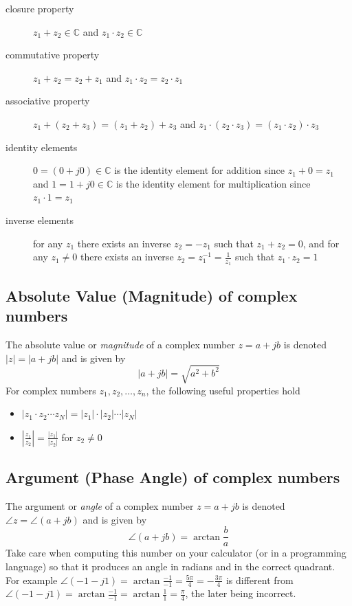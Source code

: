 \begin{description}
\item[closure property] $z_1 + z_2 \in \mathbb{C}$ and  $z_1 \cdot z_2 \in \mathbb{C}$ 
\item[commutative property] $z_1 + z_2 = z_2 + z_1$ and $z_1 \cdot z_2 = z_2 \cdot z_1$ 
\item[associative property] $z_1 + (z_2 + z_3) = (z_1 + z_2) + z_3$ and $z_1 \cdot (z_2 \cdot z_3) = (z_1 \cdot z_2) \cdot z_3$ 
\item[identity elements] $0 = (0 + j0) \in \mathbb{C}$ is the identity element for addition since $z_1 + 0 = z_1$ and $1 = 1 + j0 \in \mathbb{C}$ is the identity element for multiplication since $z_1\cdot 1 = z_1$ 
\item[inverse elements] for any $z_1$ there exists an inverse $z_2 = -z_1$ such that $z_1 + z_2 = 0$, and for any $z_1 \neq 0$ there exists an inverse $z_2 = z_1^{-1} = \tfrac{1}{z_1}$ such that $z_1 \cdot z_2 = 1$
\end{description}

\subsection*{Absolute Value (Magnitude) of complex numbers}

The absolute value or \textit{magnitude} of a complex number $z = a + jb$ is denoted $|z| = |a+jb|$ and is given by
\[
|a + jb| = \sqrt{a^2 + b^2}
\]
For complex numbers $z_1, z_2, \ldots, z_n$, the following useful properties hold
\begin{itemize}
\item $|z_1\cdot z_2 \cdots z_N| = |z_1|\cdot |z_2|\cdots|z_N|$
\item $\left| \frac{z_1}{z_2}\right| = \frac{|z_1|}{|z_2|}$ for $z_2 \neq 0$
\end{itemize}

\subsection*{Argument (Phase Angle) of complex numbers}
The argument or \textit{angle} of a complex number $z = a + jb$ is denoted $\angle z = \angle(a+jb)$ and is given by
\[
\angle(a + jb) = \arctan\frac{b}{a}
\]
Take care when computing this number on your calculator (or in a programming language) so that it produces an angle in radians and in the correct quadrant. For example $\angle(-1-j1) = \arctan\frac{-1}{-1} = \frac{5\pi}{4} = -\frac{3\pi}{4}$ is different from $\angle(-1-j1) = \arctan\frac{-1}{-1} = \arctan\frac{1}{1} = \frac{\pi}{4}$, the later being incorrect.

